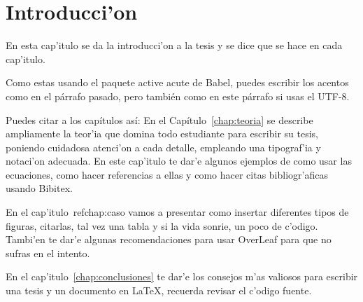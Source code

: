 \chapter{Introducci'on}


 
En esta cap’itulo se da la introducci’on  a la tesis y se dice que se hace en
cada cap’itulo.


Como estas usando el paquete active acute de Babel, puedes escribir los acentos como en el párrafo pasado,
pero también como en este párrafo si  usas el UTF-8.

Puedes citar a los capítulos así: En el Capítulo~\ref{chap:teoria} se describe ampliamente la teor’ia que 
domina todo estudiante para escribir su tesis, poniendo cuidadosa atenci’on a cada detalle, empleando una 
tipograf’ia y notaci’on adecuada. En este cap’itulo te dar’e algunos ejemplos de como usar las ecuaciones,
como hacer referencias a ellas y como hacer citas bibliogr’aficas usando Bibitex.


En el cap’itulo~ref{chap:caso} vamos a presentar como insertar diferentes tipos de figuras, citarlas, tal vez una tabla
y si la vida sonrie, un poco de c’odigo. Tambi’en te dar’e algunas recomendaciones para usar OverLeaf para que no sufras en
el intento.

En el cap’itulo~\ref{chap:conclusiones} te dar’e los consejos m’as valiosos para escribir una tesis y un documento 
en \LaTeX, recuerda revisar el c’odigo fuente.
